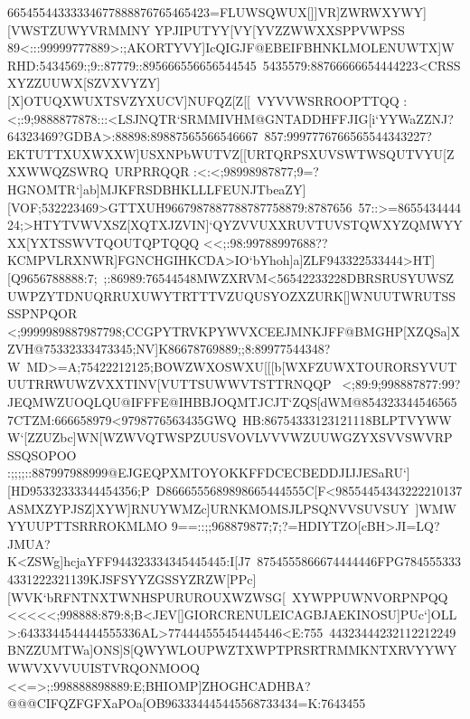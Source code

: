 {{{ 66545544333334677888876765465423=FLUWSQWUX[]]VR]ZWRWXYWY][VWSTZUWYVRMMNY%
 YPJIPUTYY[VY[YVZZWWXXSPPVWPSS}
 \hbox{89<:::99999777889>:;AKORTYVY]IcQIGJF@EBEIFBHNKLMOLENUWTX]WRHD:5434569:;9::87779::895666556656544545%
 5435579:88766666654444223<CRSSXYZZUUWX[SZVXVYZY][X]OTUQXWUXTSVZYXUCV]NUFQZ[Z[[%
 VYVVWSRROOPTTQQ}
 \hbox{:<;:9;9888877878:::<LSJNQTR`SRMMIVHM@GNTADDHFFJIG[i`YYWaZZNJ?64323469?GDBA>:88898:89887565566546667%
 857:9997776766565544343227?EKTUTTXUXWXXW]USXNPbWUTVZ[[URTQRPSXUVSWTWSQUTVYU[ZXXWWQZSWRQ%
 URPRRQQR}
 \hbox{:<:<;98998987877;9=?HGNOMTR`]ab]MJKFRSDBHKLLLFEUNJTbeaZY][VOF;532223469>GTTXUH9667987887788787758879:8787656%
 57::>=865543444424;>HTYTVWVXSZ[XQTXJZVIN]`QYZVVUXXRUVTUVSTQWXYZQMWYYXX[YXTSSWVTQOUTQPTQQQ}
 \hbox{<<;:98:99788997688??KCMPVLRXNWR]FGNCHGIHKCDA>IO`bYhoh]a]ZLF943322533444>HT][Q9656788888:7;%
 ;:86989:76544548MWZXRVM<56542233228DBRSRUSYUWSZUWPZYTDNUQRRUXUWYTRTTTVZUQUSYOZXZURK[]WNUUTWRUTSS%
 SSPNPQOR}
 \hbox{<;9999989887987798;CCGPYTRVKPYWVXCEEJMNKJFF@BMGHP[XZQSa]XZVH@75332333473345;NV]K86678769889;;8:89977544348?W%
 MD>=A;75422212125;BOWZWXOSWXU[[[b[WXFZUWXTOURORSYVUTUUTRRWUWZVXXTINV[VUTTSUWWVTSTTRNQQP%
 }
 \hbox{<;89:9;998887877:99?JEQMWZUOQLQU@IFFFE@IHBBJOQMTJCJT`ZQS[dWM@8543233445465657CTZM:666658979<9798776563435GWQ%
 HB:86754333123121118BLPTVYWWW`[ZZUZbc]WN[WZWVQTWSPZUUSVOVLVVVWZUUWGZYXSVVSWVRP%
 SSQSOPOO}
 \hbox{:;;;;::887997988999@EJGEQPXMTOYOKKFFDCECBEDDJIJJESaRU`][HD95332333344454356;P%
 D8666555689898665444555C[F<98554454343222210137ASMXZYPJSZ]XYW]RNUYWMZc]URNKMOMSJLPSQNVVSUVSUY%
 ]WMWYYUUPTTSRRROKMLMO}
 \hbox{9==::;;968879877;7;?=HDIYTZO[cBH>JI=LQ?JMUA?K<ZSWg]hcjaYFF944323334345445445:I[J7%
 8754555866674444446FPG7845553334331222321139KJSFSYYZGSSYZRZW[PPc][WVK`bRFNTNXTWNHSPURUROUXWZWSG[%
 XYWPPUWNVORPNPQQ}
 \hbox{<<<<<;998888:879:8;B<JEV[]GIORCRENULEICAGBJAEKINOSU]PUc`]OLL>:6433344544444555336AL>774444555454445446<E:755%
 44323444232112212249BNZZUMTWa]ONS]S[QWYWLOUPWZTXWPTPRSRTRMMKNTXRVYYWYWWVXVVUUISTVRQONMOOQ}
 \hbox{<<=>;:998888898889:E;BHIOMP]ZHOGHCADHBA?@@@CIFQZFGFXaPOa[OB963334445445568733434=K:7643455%
}}}

